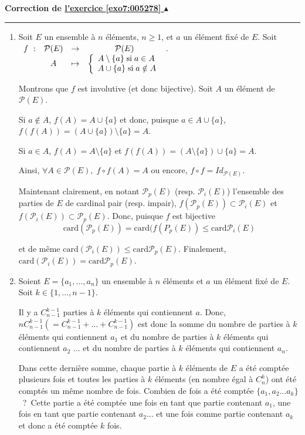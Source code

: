 \documentclass[11pt,a4paper]{article}
\newcounter{exo}
\newcommand{\correction}[1]{\hypertarget{cor7:#1}{}\label{cor7:#1}{\bf Correction de \hyperlink{exo7:#1}{l'exercice \ref{exo7:#1} $\blacktriangle$}}\vspace{1mm}\hrule\vspace{1mm}}
\begin{document}
\correction{005278}
\begin{enumerate}
\item  Soit $E$ un ensemble à $n$ éléments, $n\geq 1$, et $a$ un élément fixé de $E$. Soit $\begin{array}[t]{cccc}
f~:&\mathcal{P}(E)&\rightarrow&\mathcal{P}(E)\\
 &A&\mapsto&\left\{
 \begin{array}{l}
 A\setminus\{a\}\;\mbox{si}\;a\in A\\
 A\cup\{a\}\;\mbox{si}\;a\notin A
 \end{array}
 \right.
\end{array}$.

Montrons que $f$ est involutive (et donc bijective). Soit $A$ un élément de $\mathcal{P}(E)$.

Si $a\notin A$, $f(A)=A\cup\{a\}$ et donc, puisque $a\in A\cup\{a\}$, $f(f(A))=(A\cup\{a\})\setminus\{a\}=A$.

Si $a\in A$, $f(A)=A\setminus\{a\}$ et $f(f(A))=(A\setminus\{a\})\cup\{a\}=A$.

Ainsi, $\forall A\in\mathcal{P}(E),\;f\circ f(A)=A$ ou encore, $f\circ f=Id_{\mathcal{P}(E)}$.

Maintenant clairement, en notant $\mathcal{P}_p(E)$ (resp. $\mathcal{P}_i(E)$) l'ensemble des parties de $E$ de cardinal pair (resp. impair), $f(\mathcal{P}_p(E))\subset\mathcal{P}_i(E)$ et $f(\mathcal{P}_i(E))\subset\mathcal{P}_p(E)$. Donc, puisque $f$ est bijective 
$$\mbox{card}(\mathcal{P}_p(E))=\mbox{card}(f(P_p(E))\leq\mbox{card}\mathcal{P}_i(E)$$

et de même $\mbox{card}(\mathcal{P}_i(E))\leq\mbox{card}\mathcal{P}_p(E)$. Finalement, $\mbox{card}(\mathcal{P}_i(E))=\mbox{card}\mathcal{P}_p(E)$.

\item  
Soient $E=\{a_1,...,a_n\}$ un ensemble à $n$ éléments et $a$ un élément fixé de $E$. Soit $k\in\{1,...,n-1\}$.

Il y a  $C_{n-1}^{k-1}$ parties à $k$ éléments qui contiennent $a$. Donc, $nC_{n-1}^{k-1}(=C_{n-1}^{k-1}+...+C_{n-1}^{k-1})$ est donc la somme du nombre de parties à $k$ éléments qui contiennent $a_1$ et du nombre de parties à $k$ éléments qui contiennent $a_2$ ... et du nombre de parties à $k$ éléments qui contiennent $a_n$.

Dans cette dernière somme, chaque partie à $k$ éléments de $E$ a été comptée plusieurs fois et toutes les parties à $k$ éléments (en nombre égal à $C_n^k$) ont été comptés un même nombre de fois. Combien de fois a été comptée $\{a_1,a_2...a_k\}$~?~Cette partie a été comptée une fois en tant que partie contenant $a_1$, une fois en tant que partie contenant $a_2$... et une fois comme partie contenant $a_k$ et donc a été comptée $k$ fois.


\end{enumerate}
\end{document}
